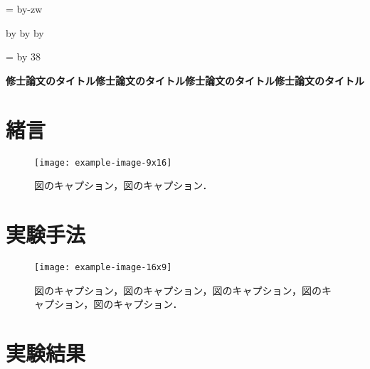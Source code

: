 \documentclass[11pt,dvipdfmx,svgnames,a4paper,uplatex]{ujarticle}
\makeatletter
\def\mojiparline#1{
  \newcounter{mpl}
  \setcounter{mpl}{#1}
  \@tempdima=\linewidth
  \advance\@tempdima by-\value{mpl}zw
  \addtocounter{mpl}{-1}
  \divide\@tempdima by \value{mpl}
  \advance\kanjiskip by\@tempdima
  \advance\parindent by\@tempdima
}
\def\linesparpage#1{
  \baselineskip=\textheight
  \divide\baselineskip by #1
}
\makeatother
\begin{document}
\mojiparline{42}  %
\linesparpage{38}  %

\centerline{\textbf{
  修士論文のタイトル修士論文のタイトル修士論文のタイトル修士論文のタイトル
}}

\section{緒言}

\begin{wrapfigure}{r}{12zw}
  \vspace*{-\intextsep}
  \centering
  \texttt{[image: example-image-9x16]}
  \caption{
    図のキャプション，図のキャプション．%
  }
  \label{fig:introduction}
  \vspace*{-1zh} %
\end{wrapfigure}

\textcolor{LightGray}{
}


\section{実験手法}  %

\begin{wrapfigure}{r}{26zw}
  \vspace*{-1.0zh} %
  \centering
  \texttt{[image: example-image-16x9]}
  \caption{
    図のキャプション，図のキャプション，図のキャプション，図のキャプション，図のキャプション．
  }
  \label{fig:experiment}
  \vspace*{-\intextsep}
\end{wrapfigure}

\textcolor{LightGray}{
}


\section{実験結果}  %
\end{document}
